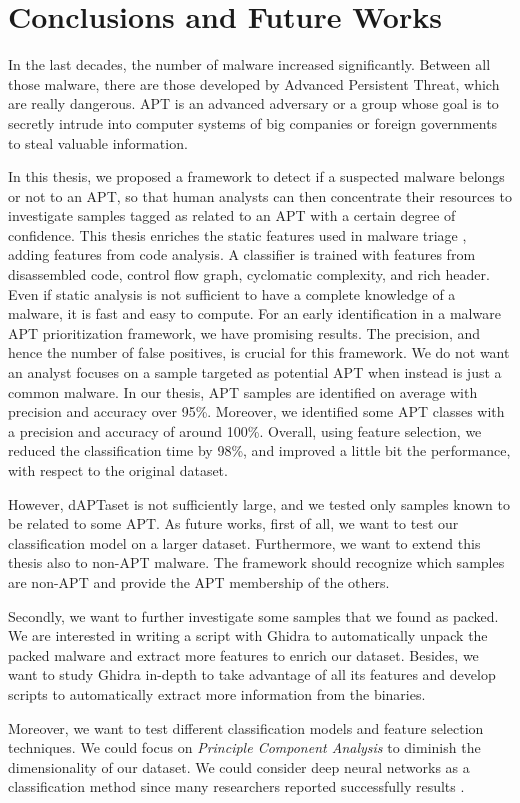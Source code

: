 \chapter{Conclusions and Future Works}
\label{ch:future}

In the last decades, the number of malware increased significantly. Between all those malware, there are those developed by Advanced Persistent Threat, which are really dangerous. APT is an advanced adversary or a group whose goal is to secretly intrude into computer systems of big companies or foreign governments to steal valuable information. 

In this thesis, we proposed a framework to detect if a suspected malware belongs or not to an APT, so that human analysts can then concentrate their resources to investigate samples tagged as related to an APT with a certain degree of confidence. This thesis enriches the static features used in malware triage \cite{laurenza2017malware}, adding features from code analysis. A classifier is trained with features from disassembled code, control flow graph, cyclomatic complexity, and rich header. Even if static analysis is not sufficient to have a complete knowledge of a malware, it is fast and easy to compute. For an early identification in a malware APT prioritization framework, we have promising results. The precision, and hence the number of false positives, is crucial for this framework. We do not want an analyst focuses on a sample targeted as potential APT when instead is just a common malware. In our thesis, APT samples are identified on average with precision and accuracy over 95\%. Moreover, we identified some APT classes with a precision and accuracy of around 100\%. Overall, using feature selection, we reduced the classification time by 98\%, and improved a little bit the performance, with respect to the original dataset.

However, dAPTaset is not sufficiently large, and we tested only samples known to be related to some APT.
As future works, first of all, we want to test our classification model on a larger dataset. Furthermore, we want to extend this thesis also to non-APT malware. The framework should recognize which samples are non-APT and provide the APT membership of the others. 

Secondly, we want to further investigate some samples that we found as packed. We are interested in writing a script with Ghidra to automatically unpack the packed malware and extract more features to enrich our dataset. Besides, we want to study Ghidra in-depth to take advantage of all its features and develop scripts to automatically extract more information from the binaries.

Moreover, we want to test different classification models and feature selection techniques. We could focus on \textit{Principle Component Analysis} to diminish the dimensionality of our dataset. We could consider deep neural networks as a classification method since many researchers reported successfully results \cite{zhou2018malware} \cite{tobiyama2016malware}. 